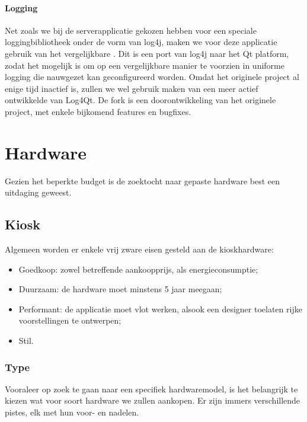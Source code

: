 \documentclass[verslag.tex]{subfiles}
\begin{document}
\subsubsection{Logging}

Net zoals we bij de serverapplicatie gekozen hebben voor een speciale loggingbibliotheek onder de vorm van log4j, maken we voor deze applicatie gebruik van het vergelijkbare . Dit is een port van log4j naar het Qt platform, zodat het mogelijk is om op een vergelijkbare manier te voorzien in uniforme logging die nauwgezet kan geconfigureerd worden. Omdat het originele project al enige tijd inactief is, zullen we wel gebruik maken van een meer actief ontwikkelde  van Log4Qt. De fork is een doorontwikkeling van het originele project, met enkele bijkomend features en bugfixes.


%
%

\chapter{Hardware}
\label{ontwerp:hardware}

Gezien het beperkte budget is de zoektocht naar gepaste hardware best een uitdaging geweest.

\section{Kiosk}
\label{ontwerp:hardware:kiosk}

Algemeen worden er enkele vrij zware eisen gesteld aan de kioskhardware:
\begin{itemize}
\item Goedkoop: zowel betreffende aankoopprijs, als energieconsumptie;
\item Duurzaam: de hardware moet minstens 5 jaar meegaan;
\item Performant: de applicatie moet vlot werken, alsook een designer toelaten rijke voorstellingen te ontwerpen;
\item Stil.
\end{itemize}

\subsection{Type}

Vooraleer op zoek te gaan naar een specifiek hardwaremodel, is het belangrijk te kiezen wat voor soort hardware we zullen aankopen. Er zijn immers verschillende pistes, elk met hun voor- en nadelen.
\end{document}
